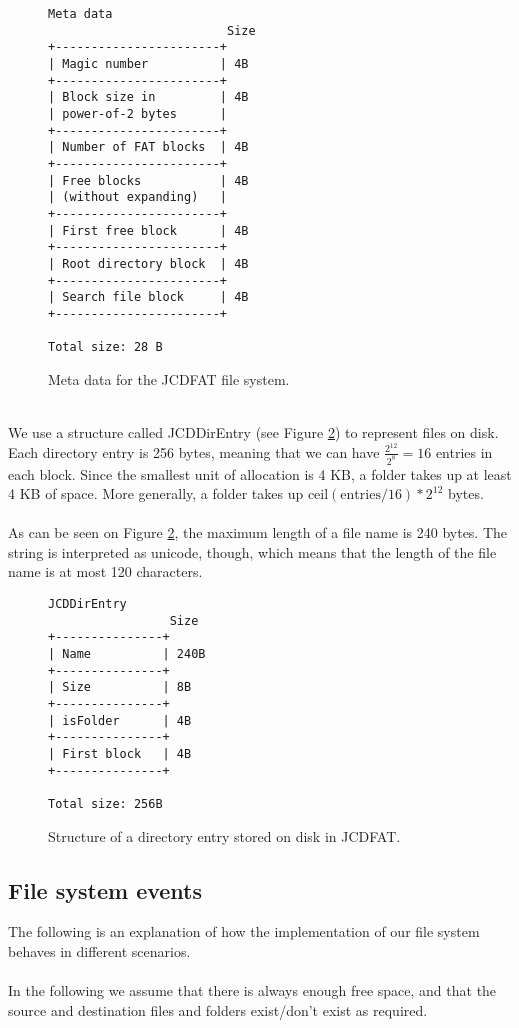 \documentclass[a4paper,12pt]{article}
\begin{document}
\begin{figure}[ht]
    \begin{verbatim}
Meta data
                         Size
+-----------------------+
| Magic number          | 4B
+-----------------------+
| Block size in         | 4B
| power-of-2 bytes      |
+-----------------------+
| Number of FAT blocks  | 4B
+-----------------------+
| Free blocks           | 4B
| (without expanding)   |
+-----------------------+
| First free block      | 4B
+-----------------------+
| Root directory block  | 4B
+-----------------------+
| Search file block     | 4B
+-----------------------+

Total size: 28 B
    \end{verbatim}
    \caption{Meta data for the JCDFAT file system.}
    \label{fig:meta_data}
\end{figure}
~\\
We use a structure called JCDDirEntry (see Figure \ref{fig:directory_entry}) to represent files on disk. Each directory entry is 256 bytes, meaning that we can have $\frac{2^{12}}{2^8} = 16$ entries in each block. Since the smallest unit of allocation is 4 KB, a folder takes up at least 4 KB of space. More generally, a folder takes up $\text{ceil}(\text{entries} / 16) * 2^{12}$ bytes.\\
\\
As can be seen on Figure \ref{fig:directory_entry}, the maximum length of a file name is 240 bytes. The string is interpreted as unicode, though, which means that the length of the file name is at most 120 characters.

\begin{figure}[ht]
    \begin{verbatim}
JCDDirEntry
                 Size
+---------------+
| Name          | 240B
+---------------+
| Size          | 8B
+---------------+
| isFolder      | 4B
+---------------+
| First block   | 4B
+---------------+

Total size: 256B
    \end{verbatim}
    \caption{Structure of a directory entry stored on disk in JCDFAT.}
    \label{fig:directory_entry}
\end{figure}

\subsection{File system events}\label{file-system-events}
The following is an explanation of how the implementation of our file system behaves in different scenarios.\\
\\
In the following we assume that there is always enough free space, and that the source and destination files and folders exist/don't exist as required.\\
\end{document}
